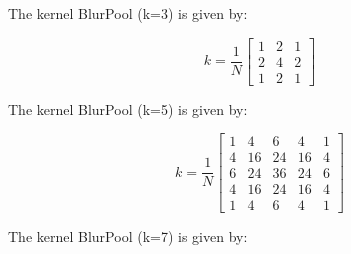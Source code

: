 The kernel BlurPool (k=3) is given by:

\[
k=\frac{1}{N}
	\begin{bmatrix}
	1 & 2 & 1 \\
	2 & 4 & 2 \\
	1 & 2 & 1	
	\end{bmatrix}
\]

The kernel BlurPool (k=5) is given by:

\[
k= \frac{1}{N}
	\begin{bmatrix}
	 1 & 4 & 6 & 4 & 1 \\
	 4 & 16 & 24 & 16 & 4 \\
	 6 & 24 & 36 & 24 & 6 \\
	 4 & 16 & 24 & 16 & 4 \\
	 1 & 4 & 6 & 4 & 1
	\end{bmatrix}
\]

The kernel BlurPool (k=7) is given by:

